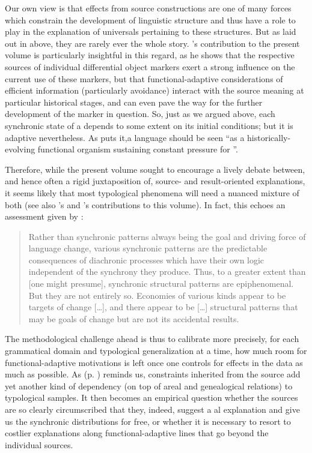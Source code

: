 \documentclass[output=paper]{langsci/langscibook}
\begin{document}
Our own view is that  effects from source constructions are one of many forces which constrain the development of linguistic structure and thus have a role to play in the explanation of universals pertaining to these structures. But as laid out in  above, they are rarely ever the whole story. ’s contribution to the present volume is particularly insightful in this regard, as he shows that the respective sources of individual differential object markers exert a strong influence on the current use of these markers, but that functional-adaptive considerations of efficient information  (particularly  avoidance) interact with the source meaning at particular historical stages, and can even pave the way for the further development of the marker in question. So, just as we argued above, each synchronic state of a  depends to some extent on its initial conditions; but it is adaptive nevertheless. As \citet[263]{Shibatani2006} puts it,\largerpage a language should be seen “as a historically-evolving functional organism sustaining constant pressure for ”. 

Therefore, while the present volume sought to encourage a lively debate between, and hence often a rigid juxtaposition of, source- and result-oriented explanations, it seems likely that most typological phenomena will need a nuanced mixture of both (see also ’s and ’s contributions to this volume). In fact, this echoes an assessment given by \citet[287--288]{Nichols2008_Diach}:


\begin{quote}
Rather than synchronic patterns always being the goal and driving force of language change, various synchronic patterns are the predictable consequences of diachronic processes which have their own logic independent of the synchrony they produce. Thus, to a greater extent than [one might presume], synchronic structural patterns are epiphenomenal. But they are not entirely so. Economies of various kinds appear to be targets of change […], and there appear to be […] structural patterns that may be goals of change but are not its accidental results.
\end{quote}

The methodological challenge ahead is thus to calibrate more precisely, for each grammatical domain and typological generalization at a time, how much room for functional-adaptive motivations is left once one controls for  effects in the data as much as possible. As  (p. \pageref{p:collins:dependency}) reminds us, constraints inherited from the source add yet another kind of dependency (on top of areal and genealogical relations) to typological samples. It then becomes an empirical question whether the sources are so clearly circumscribed that they, indeed, suggest a al explanation and give us the synchronic distributions for free, or whether it is necessary to resort to costlier explanations along functional-adaptive lines that go beyond the individual sources.
\end{document}
